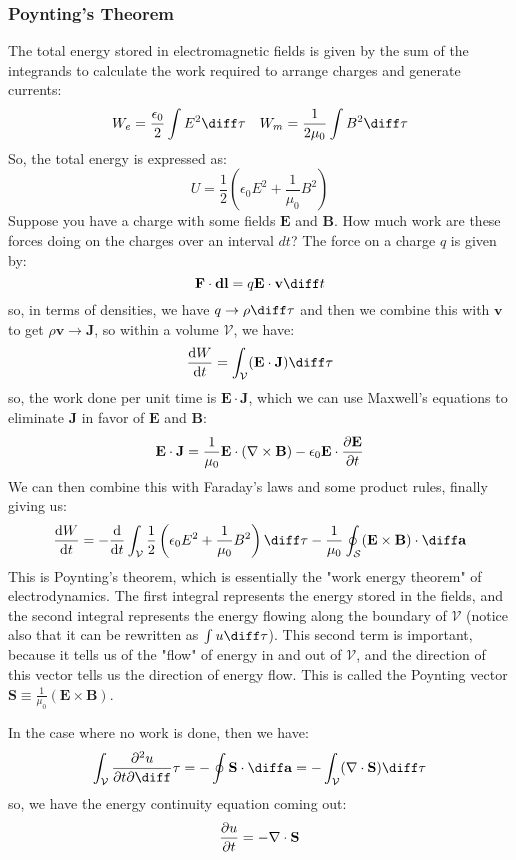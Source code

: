 \documentclass[10pt]{article}
\begin{document}
	\subsubsection{Poynting's Theorem}
	The total energy stored in electromagnetic fields is given by the sum of the integrands to
	calculate the work required to arrange charges and generate currents:
	\[
		W_e = \frac{\epsilon_0}{2} \int E^2 \diff \tau \quad W_m = \frac{1}{2 \mu_0} \int B^2 \diff
		\tau
	\]
	So, the total energy is expressed as:
	\[
		U = \frac{1}{2}\left( \epsilon_0 E^2 + \frac{1}{\mu_0}B^2 \right)
	\]
	Suppose you have a charge with some fields \( \mathbf{E} \) and \( \mathbf{B} \). How much work
	are these forces doing on the charges over an interval \( dt \)? The force on a charge \( q \) is
	given by:
	\[
		\mathbf{F} \cdot \mathbf{dl} = q \mathbf{E} \cdot \mathbf{v} \diff t
	\]
	so, in terms of densities, we have \( q \to \rho \diff\tau \) and then we combine this with \(
	\mathbf{v} \) to get \( \rho \mathbf{v} \to \mathbf{J} \), so within a volume \( \mathcal{V} \),
	we have:
	\[
		\dv{W}{t} = \int_{\mathcal{V}} (\mathbf{E} \cdot \mathbf{J}) \diff\tau
	\]
	so, the work done per unit time is \( \mathbf{E} \cdot \mathbf{J} \), which we can use Maxwell's
	equations to eliminate \( \mathbf{J} \) in favor of \( \mathbf{E} \) and \( \mathbf{B} \):
	\[
		\mathbf{E} \cdot \mathbf{J} = \frac{1}{\mu_0} \mathbf{E} \cdot (\nabla \times \mathbf{B}) -
		\epsilon_0 \mathbf{E} \cdot \pdv{\mathbf{E}}{t}
	\]
	We can then combine this with Faraday's laws and some product rules, finally giving us:
	\[
		\dv{W}{t} = -\dv{t} \int_{\mathcal{V}} \frac{1}{2}\left( \epsilon_0 E^2 + \frac{1}{\mu_0}B^2 \right)
		\diff \tau - \frac{1}{\mu_0} \oint_{\mathcal{S}} (\mathbf{E} \times \mathbf{B}) \cdot \diff \mathbf{a}
	\]
	This is Poynting's theorem, which is essentially the "work energy theorem" of electrodynamics. The first
	integral represents the energy stored in the fields, and the second integral represents the energy
	flowing along the boundary of \( \mathcal{V} \) (notice also that it can be rewritten as \( \int u \diff
	\tau\)). This second term is important, because it tells us of
	the "flow" of energy in and out of \( \mathcal{V} \), and the direction of this vector tells us the
	direction of energy flow. This is called the Poynting vector \( \mathbf{S} \equiv
	\frac{1}{\mu_0}(\mathbf{E} \times \mathbf{B}) \).        

	In the case where no work is done, then we have: 
	\[
		\int_{\mathcal{V}} \pdv{u}{t} \diff \tau = -\oint \mathbf{S} \cdot \diff \mathbf{a} =
		-\int_{\mathcal{V}} (\nabla \cdot \mathbf{S}) \diff \tau
	\]
	so, we have the energy continuity equation coming out:
	\[
		\pdv{u}{t} = -\nabla \cdot \mathbf{S}
	\]
\end{document}

